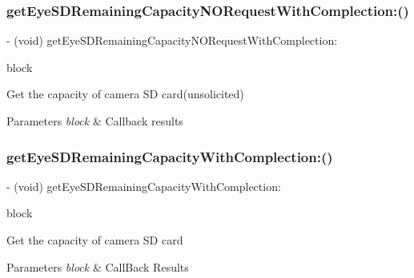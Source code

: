 \subsubsection{\texorpdfstring{get\+Eye\+S\+D\+Remaining\+Capacity\+N\+O\+Request\+With\+Complection\+:()}{getEyeSDRemainingCapacityNORequestWithComplection:()}}
{\footnotesize\ttfamily -\/ (void) get\+Eye\+S\+D\+Remaining\+Capacity\+N\+O\+Request\+With\+Complection\+: \begin{DoxyParamCaption}\item[{(void($^\wedge$)(N\+S\+Integer remaining\+Capacity, N\+S\+Error $\ast$\hyperlink{group___p_v_s_d_k___c_o_r_e___a_p_i___m_o_u_n_t_c_o_n_t_r_o_l_ga5a1de33b230662127568783314b4a54d}{\+\_\+\+Nullable} error))}]{block }\end{DoxyParamCaption}}

Get the capacity of camera SD card(unsolicited)


\begin{DoxyParams}{Parameters}
{\em block} & Callback results \\
\hline
\end{DoxyParams}
\mbox{\label{interface_p_v_camera_a5f07a09355fa80150a148b2e233a9f42}} 
\subsubsection{\texorpdfstring{get\+Eye\+S\+D\+Remaining\+Capacity\+With\+Complection\+:()}{getEyeSDRemainingCapacityWithComplection:()}}
{\footnotesize\ttfamily -\/ (void) get\+Eye\+S\+D\+Remaining\+Capacity\+With\+Complection\+: \begin{DoxyParamCaption}\item[{(void($^\wedge$)(N\+S\+Integer remaining\+Capacity, N\+S\+Error $\ast$\hyperlink{group___p_v_s_d_k___c_o_r_e___a_p_i___m_o_u_n_t_c_o_n_t_r_o_l_ga5a1de33b230662127568783314b4a54d}{\+\_\+\+Nullable} error))}]{block }\end{DoxyParamCaption}}

Get the capacity of camera SD card


\begin{DoxyParams}{Parameters}
{\em block} & Call\+Back Results \\
\hline
\end{DoxyParams}
\mbox{\label{interface_p_v_camera_a7246fd0017db39695dbed1493e14d8af}} 
